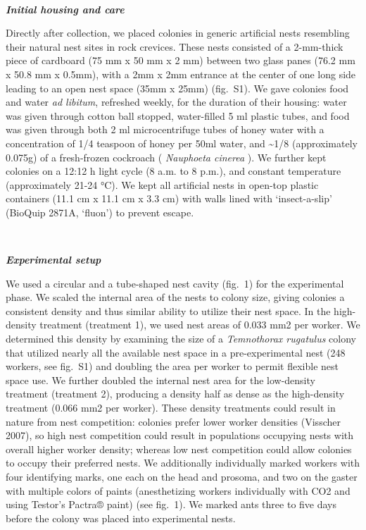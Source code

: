 \documentclass[3p]{elsarticle} %
\begin{document}
~

\textbf{\emph{Initial housing and care}}

Directly after collection, we placed colonies in generic artificial
nests resembling their natural nest sites in rock crevices. These nests
consisted of a 2-mm-thick piece of cardboard (75 mm x 50 mm x 2 mm)
between two glass panes (76.2 mm x 50.8 mm x 0.5mm), with a 2mm x 2mm
entrance at the center of one long side leading to an open nest space
(35mm x 25mm) (fig.~S1). We gave colonies food and water \emph{ad
libitum}, refreshed weekly, for the duration of their housing: water was
given through cotton ball stopped, water-filled 5 ml plastic tubes, and
food was given through both 2 ml microcentrifuge tubes of honey water
with a concentration of 1/4 teaspoon of honey per 50ml water, and
\textasciitilde1/8 (approximately 0.075g) of a fresh-frozen cockroach (
\emph{Nauphoeta cinerea} ). We further kept colonies on a 12:12 h light
cycle (8 a.m. to 8 p.m.), and constant temperature (approximately 21-24
°C). We kept all artificial nests in open-top plastic containers (11.1
cm x 11.1 cm x 3.3 cm) with walls lined with `insect-a-slip' (BioQuip
2871A, `fluon') to prevent escape.

~

\textbf{\emph{Experimental setup}}

We used a circular and a tube-shaped nest cavity (fig.~1) for the
experimental phase. We scaled the internal area of the nests to colony
size, giving colonies a consistent density and thus similar ability to
utilize their nest space. In the high-density treatment (treatment 1),
we used nest areas of 0.033 mm2 per worker. We determined this density
by examining the size of a \emph{Temnothorax rugatulus} colony that
utilized nearly all the available nest space in a pre-experimental nest
(248 workers, see fig.~S1) and doubling the area per worker to permit
flexible nest space use. We further doubled the internal nest area for
the low-density treatment (treatment 2), producing a density half as
dense as the high-density treatment (0.066 mm2 per worker). These
density treatments could result in nature from nest competition:
colonies prefer lower worker densities (Visscher 2007), so high nest
competition could result in populations occupying nests with overall
higher worker density; whereas low nest competition could allow colonies
to occupy their preferred nests. We additionally individually marked
workers with four identifying marks, one each on the head and prosoma,
and two on the gaster with multiple colors of paints (anesthetizing
workers individually with CO2 and using Testor's Pactra® paint) (see
fig.~1). We marked ants three to five days before the colony was placed
into experimental nests.
\end{document}
